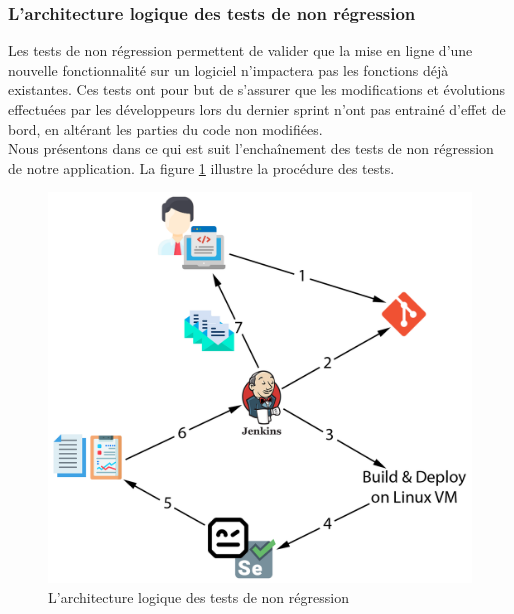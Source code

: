 \subsubsection{L'architecture logique des tests de non régression}
Les tests de non régression permettent de valider que la mise en ligne d’une nouvelle fonctionnalité sur un logiciel n’impactera pas les fonctions déjà existantes. Ces tests ont pour but de s’assurer que les modifications et évolutions effectuées par les développeurs lors du dernier sprint n’ont pas entrainé d’effet de bord, en altérant les parties du code non modifiées.\\
Nous présentons dans ce qui est suit l'enchaînement des tests de non régression de notre application. La figure \ref{fig:jenkins-schema} illustre la procédure des tests.
\begin{figure}[H]
	\centering
	\includegraphics[width=0.5\linewidth]{img/jenkins}
	\caption[L'architecture logique des tests de non régression]{L'architecture logique des tests de non régression}
	\label{fig:jenkins-schema}
\end{figure}
